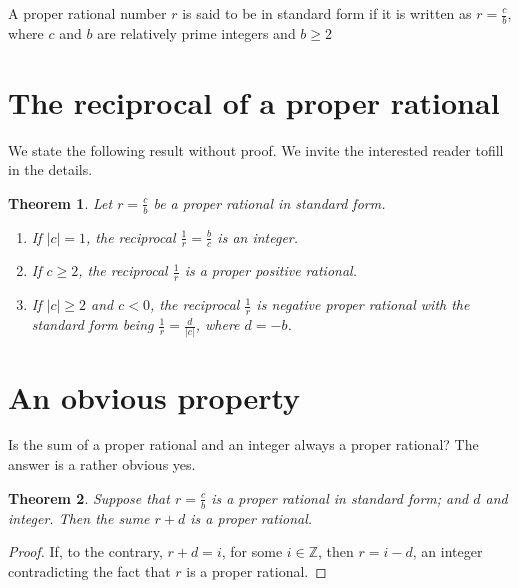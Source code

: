 \documentclass[12pt]{article}
\newtheorem{theorem}{Theorem}
\begin{document}
\vspace{.15in}

 A proper rational number $r$ is said to be in
standard form if it is written as $r = \frac{c}{b}$, where $c$ and $b$ are
relatively prime integers and $b \geq 2$

\section{The reciprocal of a proper rational}

We state the following result without proof.  We invite the interested reader tofill in the details.

\begin{theorem}  Let $r = \frac{c}{b}$ be a proper rational in standard form.  

\begin{enumerate}
\item[(i)] If $|c|=1$, the reciprocal $\frac{1}{r} = \frac{b}{c}$ is an
  integer.

\item[(i)] If $c \geq 2$, the reciprocal $\frac{1}{r}$ is a proper positive
  rational.

\item[(iii)]  If $|c|\geq 2$ and $c < 0$, the reciprocal $\frac{1}{r}$ is
  negative proper rational with the standard form being $\frac{1}{r} =
  \frac{d}{|c|}$, where $d=-b$.
\end{enumerate}
\end{theorem}

\section{An obvious property}

Is the sum of a proper rational and an integer always a proper rational?  The
answer is a rather obvious yes.

\begin{theorem}  Suppose that $r = \frac{c}{b}$ is a proper rational in
  standard form; and $d$ and integer.  Then the sume $r+d$ is a proper
  rational.
\end{theorem}

\begin{proof}  If, to the contrary, $r+d=i$, for some $i \in {\mathbb Z}$, then $r
  = i-d$, an integer contradicting the fact that $r$ is a proper
  rational. \end{proof} 
\end{document}
